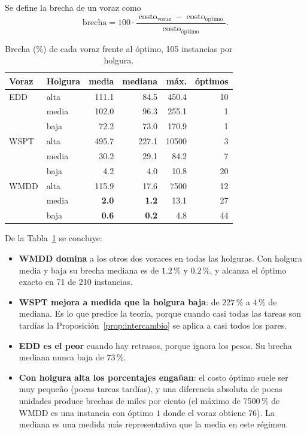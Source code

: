 \documentclass[10pt,twocolumn,letterpaper]{article}
\newcommand{\costo}{\operatorname{costo}}
\begin{document}
Se define la brecha de un voraz como
\[
\text{brecha}=100\cdot\frac{\costo_{\text{voraz}}-\costo_{\text{óptimo}}}{\costo_{\text{óptimo}}}.
\]

\begin{table}[h]
\centering
\caption{Brecha (\%) de cada voraz frente al óptimo, 105 instancias por holgura.}\label{tab:brecha}
\small\setlength{\tabcolsep}{4pt}
\begin{tabular}{llrrrr}
\toprule
Voraz & Holgura & media & mediana & máx. & óptimos\\
\midrule
EDD  & alta  & 111.1 & 84.5 & 450.4 & 10\\
     & media & 102.0 & 96.3 & 255.1 & 1\\
     & baja  & 72.2  & 73.0 & 170.9 & 1\\
\midrule
WSPT & alta  & 495.7 & 227.1 & 10500 & 3\\
     & media & 30.2  & 29.1  & 84.2  & 7\\
     & baja  & 4.2   & 4.0   & 10.8  & 20\\
\midrule
WMDD & alta  & 115.9 & 17.6 & 7500  & 12\\
     & media & \textbf{2.0} & \textbf{1.2} & 13.1 & 27\\
     & baja  & \textbf{0.6} & \textbf{0.2} & 4.8  & 44\\
\bottomrule
\end{tabular}
\end{table}

De la Tabla~\ref{tab:brecha} se concluye:
\begin{itemize}
  \item \textbf{WMDD domina} a los otros dos voraces en todas las holguras. Con
        holgura media y baja su brecha mediana es de $1.2$\,\% y $0.2$\,\%, y
        alcanza el óptimo exacto en 71 de 210 instancias.
  \item \textbf{WSPT mejora a medida que la holgura baja}: de $227$\,\% a
        $4$\,\% de mediana. Es lo que predice la teoría, porque cuando casi
        todas las tareas son tardías la Proposición~\ref{prop:intercambio}
        se aplica a casi todos los pares.
  \item \textbf{EDD es el peor} cuando hay retrasos, porque ignora los pesos.
        Su brecha mediana nunca baja de $73$\,\%.
  \item \textbf{Con holgura alta los porcentajes engañan}: el costo óptimo
        suele ser muy pequeño (pocas tareas tardías), y una diferencia
        absoluta de pocas unidades produce brechas de miles por ciento (el
        máximo de 7500\,\% de WMDD es una instancia con óptimo $1$ donde el voraz obtiene $76$). La
        mediana es una medida más representativa que la media en este
        régimen.
\end{itemize}
\end{document}
